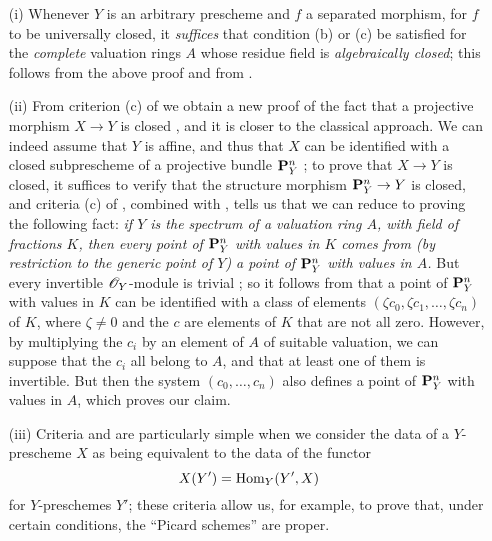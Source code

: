 \begin{remarks}[7.3.9]
\label{II.7.3.9}
\begin{enumerate}
    \item[\rm{(i)}] Whenever $Y$ is an arbitrary prescheme and $f$ a separated morphism, for $f$ to be universally closed, it \emph{suffices} that condition (b) or (c) be satisfied for the \emph{complete} valuation rings $A$ whose residue field is \emph{algebraically closed};
        this follows from the above proof and from .
    \item[\rm{(ii)}] From criterion (c) of  we obtain a new proof of the fact that a projective morphism $X\to Y$ is closed , and it is closer to the classical approach.
        We can indeed assume that $Y$ is affine, and thus that $X$ can be identified with a closed subprescheme of a projective bundle $\mathbf{P}_Y^n$ ;
        to prove that $X\to Y$ is closed, it suffices to verify that the structure morphism $\bb{P}_Y^n\to Y$ is closed, and criteria (c) of , combined with , tells us that we can reduce to proving the following fact:
        \emph{if $Y$ is the spectrum of a valuation ring $A$, with field of fractions $K$, then every point of $\mathbf{P}_Y^n$ with values in $K$ comes from (by restriction to the generic point of $Y$) a point of $\mathbf{P}_Y^n$ with values in $A$.}
        But every invertible $\mathscr{O}_Y$-module is trivial ;
        so it follows from  that a point of $\mathbf{P}_Y^n$ with values in $K$ can be identified with a class of elements $(\zeta c_0,\zeta c_1,\ldots,\zeta c_n)$ of $K$, where $\zeta\neq0$ and the $c$ are elements of $K$ that are not all zero.
        However, by multiplying the $c_i$ by an element of $A$ of
        suitable valuation, we can suppose that the $c_i$ all belong to $A$, and that at least one of them is invertible.
        But then  the system $(c_0,\ldots,c_n)$ also defines a point of $\mathbf{P}_Y^n$ with values in $A$, which proves our claim.
    \item[\rm{(iii)}] Criteria  and  are particularly simple when we consider the data of a $Y$-prescheme $X$ as being equivalent to the data of the functor
        \[
            X(Y') = \operatorname{Hom}_Y(Y',X)
        \]
        for $Y$-preschemes $Y'$;
        these criteria allow us, for example, to prove that, under certain conditions, the ``Picard schemes'' are proper.
\end{enumerate}
\end{remarks}

